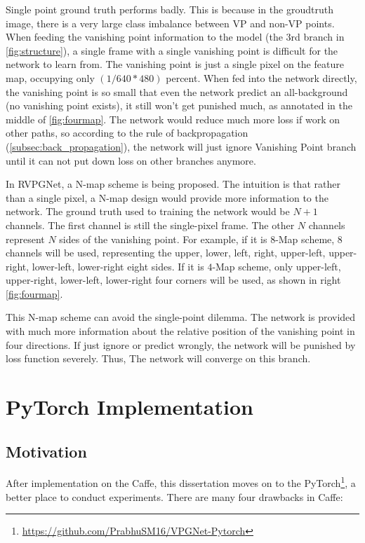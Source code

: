 \begin{spacing}{1.5}
Single point ground truth performs badly. This is because in the groudtruth image, there is a very large class imbalance between VP and non-VP points. When feeding the vanishing point information to the model (the  $3$rd branch in \autoref{fig:structure}), a single frame with a single vanishing point is difficult for the network to learn from. The vanishing point is just a single pixel on the feature map, occupying only $({1}/{640*480})$ percent. When fed into the network directly, the vanishing point is so small that even the network predict an all-background (no vanishing point exists), it still won't get punished much, as annotated in the middle of \autoref{fig:fourmap}. The network would reduce much more loss if work on other paths, so according to the rule of backpropagation (\autoref{subsec:back_propagation}), the network will just ignore Vanishing Point branch until it can not put down loss on other branches anymore.

In RVPGNet, a N-map scheme is being proposed. The intuition is that rather than a single pixel, a N-map design would provide more information to the network. The ground truth used to training the network would be $N+1$ channels. The first channel is still the single-pixel frame. The other $N$ channels represent $N$ sides of the vanishing point. For example, if it is $8$-Map scheme, $8$ channels will be used, representing the upper, lower, left, right, upper-left, upper-right, lower-left, lower-right eight sides. If it is $4$-Map scheme, only upper-left, upper-right, lower-left, lower-right four corners will be used, as shown in right \autoref{fig:fourmap}.

This N-map scheme can avoid the single-point dilemma. The network is provided with much more information about the relative position of the vanishing point in four directions. If just ignore or predict wrongly, the network will be punished by loss function severely. Thus, The network will converge on this branch.

\section{PyTorch Implementation}
\label{sec:MD_PyTorch}

\subsection{Motivation}

After implementation on the Caffe, this dissertation moves on to the PyTorch\footnote{\raggedright \url{https://github.com/PrabhuSM16/VPGNet-Pytorch}}, a better place to conduct experiments. There are many four drawbacks in Caffe: 


\end{spacing}
